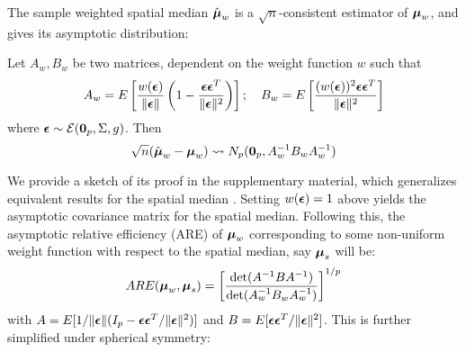 \documentclass[fleqn,11pt]{article}
\begin{document}
The sample weighted spatial median $\hat{{\boldsymbol{\mu}}}_w$ is a $\sqrt n$-consistent estimator of ${\boldsymbol{\mu}}_w$, and gives its asymptotic distribution:
%
\begin{Theorem}
Let $A_w, B_w$ be two matrices, dependent on the weight function $w$ such that
%
$$
A_w = E \left[ \frac{w( {\boldsymbol{\epsilon}} ) }{\| {\boldsymbol{\epsilon}} \|} \left( 1 - \frac{{\boldsymbol{\epsilon}} {\boldsymbol{\epsilon}}^T}{\| {\boldsymbol{\epsilon}} \|^2} \right) \right]; \quad B_w = E \left[ \frac{(w( {\boldsymbol{\epsilon}} ))^2 {\boldsymbol{\epsilon}} {\boldsymbol{\epsilon}}^T}{\| {\boldsymbol{\epsilon}} \|^2} \right]
$$
%
where ${\boldsymbol{\epsilon}} \sim \mathcal E({\bf 0}_p, \Sigma, g)$. Then
%
\begin{equation}
\sqrt n (\hat{{\boldsymbol{\mu}}}_w - {\boldsymbol{\mu}}_w) \leadsto N_p ({\bf 0}_p, A_w^{-1} B_w A_w^{-1})
\end{equation}
\end{Theorem}
%

We provide a sketch of its proof in the supplementary material, which generalizes equivalent results for the spatial median \citep{OjaBook10}. Setting $w({\boldsymbol{\epsilon}})=1$ above yields the asymptotic covariance matrix for the spatial median. Following this, the asymptotic relative efficiency (ARE) of ${\boldsymbol{\mu}}_w$ corresponding to some non-uniform weight function with respect to the spatial median, say ${\boldsymbol{\mu}}_s$ will be:
%
$$
ARE( {\boldsymbol{\mu}}_w, {\boldsymbol{\mu}}_s) = \left[ \frac{\text{det} (A^{-1} B A^{-1})}{\text{det} (A_w^{-1} B_w A_w^{-1})} \right]^{1/p}
$$
%
with $A = E [ 1/ \| {\boldsymbol{\epsilon}} \| ( I_p - {\boldsymbol{\epsilon}} {\boldsymbol{\epsilon}}^T/ \| {\boldsymbol{\epsilon}} \|^2 ) ]$ and $B = E [ {\boldsymbol{\epsilon}} {\boldsymbol{\epsilon}}^T/ \| {\boldsymbol{\epsilon}} \|^2 ]$. This is further simplified under spherical symmetry:
\end{document}
